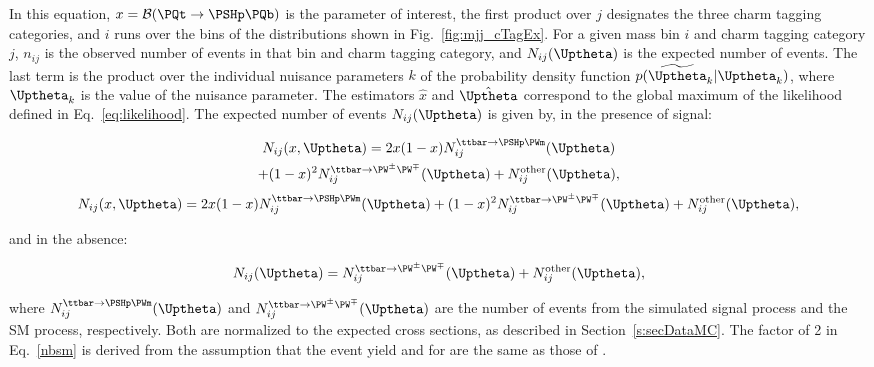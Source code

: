 In this equation, $x = \Bthb$ is the parameter of interest, the first product over
$j$ designates the three charm tagging categories, and $i$ runs over the bins of the \mjj distributions shown
in Fig.~\ref{fig:mjj_cTagEx}. For a given mass bin $i$ and charm tagging category $j$, $n_{ij}$ is the
observed number of events in that bin and charm tagging category, and $N_{ij}(\Uptheta)$ is the expected
number of events. The last term is the product over the individual nuisance parameters $k$ of the probability
density function $p(\widetilde{\Uptheta}_k|\Uptheta_k)$, where $\Uptheta_k$ is the value of the nuisance
parameter.  The estimators $\hat{x}$ and $\hat{\Uptheta}$ correspond to the global maximum of the likelihood
defined in Eq.~\ref{eq:likelihood}. The expected number of events $N_{ij}(\Uptheta)$ is given by, in the
presence of signal:
\begin{linenomath}
{\begin{multline}
\label{nbsm}
N_{ij}(x,\Uptheta) = 2x(1-x)N_{ij}^{\ttbar \to \PSHp \PWm}(\Uptheta) \\
+(1-x)^2 N_{ij}^{\ttbar\to \PW^{\pm}\PW^{\mp}}(\Uptheta) + 
N_{ij}^{\text{other}}(\Uptheta),
\end{multline}}
{\begin{equation}
\label{nbsm}
N_{ij}(x,\Uptheta) = 2x(1-x)N_{ij}^{\ttbar \to \PSHp \PWm}(\Uptheta) + 
(1-x)^2 N_{ij}^{\ttbar\to \PW^{\pm}\PW^{\mp}}(\Uptheta) + 
N_{ij}^{\text{other}}(\Uptheta),
\end{equation}}
\end{linenomath}
and in the absence:
\begin{linenomath}
   \begin{equation}
       N_{ij}(\Uptheta) = N_{ij}^{\ttbar \to \PW^{\pm}\PW^{\mp}}(\Uptheta) + N_{ij}^{\text{other}}(\Uptheta),
   \end{equation}
   \end{linenomath}
where $N_{ij}^{\ttbar\to \PSHp\PWm}(\Uptheta)$ and $N_{ij}^{\ttbar \to \PW^{\pm}\PW^{\mp}}(\Uptheta)$ are the
number of events from the simulated signal process and the SM \ttbar process, respectively. Both are
normalized to the expected \ttbar cross sections, as described in Section~\ref{s:secDataMC}. The factor of 2
in Eq.~\ref{nbsm} is derived from the assumption that the event yield and \Bthbbar for \PSHm are the same as
those of \PSHp.

